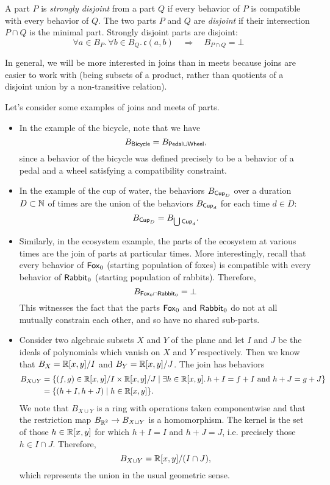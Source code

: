 \begin{defn}
A part $P$ is \emph{strongly disjoint} from a part $Q$ if every behavior of $P$
is compatible with every behavior of $Q$. The two parts $P$ and $Q$ are
\emph{disjoint} if their intersection $P \cap Q$ is the minimal part. Strongly
disjoint parts are disjoint:
$$\forall a \in B_P.\, \forall b \in B_Q.\, \mathfrak{c}(a, b) \quad\Rightarrow\quad B_{P \cap Q} = \bot$$
\end{defn}

In general, we will be more interested in joins than in meets because joins are easier to work with (being subsets of a product, rather than quotients of a disjoint union by a non-transitive relation).

\begin{ex}
Let's consider some examples of joins and meets of parts.
\begin{itemize}
    \item In the example of the bicycle, note that we have
    $$B_{\mathsf{{Bicycle}}} = B_{\mathsf{{Pedal}} \cup \mathsf{{Wheel}}},$$
    since a behavior of the bicycle was defined precisely to be a behavior of a pedal and a wheel satisfying a compatibility constraint.
    
    \item In the example of the cup of water, the behaviors $B_{\mathsf{{Cup}}_D}$ over a duration $D \subset \operatorname{\mathbb{N}}$ of times are the union of the behaviors $B_{\mathsf{{Cup}}_d}$ for each time $d \in D$:
    $$B_{\mathsf{{Cup}}_D} = B_{\bigcup \mathsf{{Cup}}_d}.$$
    
    \item Similarly, in the ecosystem example, the parts of the ecosystem at various times are the join of parts at particular times. More interestingly, recall that every behavior of $\mathsf{{Fox}}_0$ (starting population of foxes) is compatible with every behavior of $\mathsf{{Rabbit}}_0$ (starting population of rabbits). Therefore, 
    $$B_{\mathsf{{Fox}}_0 \cap \mathsf{{Rabbit}}_0} = \bot$$
    This witnesses the fact that the parts $\mathsf{{Fox}}_0$ and $\mathsf{{Rabbit}}_0$ do not at all mutually constrain each other, and so have no shared sub-parts.
    
    \item Consider two algebraic subsets $X$ and $Y$ of the plane and let $I$ and $J$ be the ideals of polynomials which vanish on $X$ and $Y$ respectively. Then we know that $B_X = \operatorname{\mathbb{R}}[x, y]/I$ and $B_Y = \operatorname{\mathbb{R}}[x, y]/J$. The join has behaviors 
    \begin{align*}
        B_{X \cup Y} &= \{(f, g) \in \operatorname{\mathbb{R}}[x, y]/I \times \operatorname{\mathbb{R}}[x, y]/J \mid \exists h \in \operatorname{\mathbb{R}}[x, y].\, h + I = f + I \mbox{ and } h + J = g + J\} \\
            &= \{(h + I, h + J) \mid h \in \operatorname{\mathbb{R}}[x, y]\}.
    \end{align*}
    We note that $B_{X \cup Y}$ is a ring with operations taken componentwise and that the restriction map $B_{\operatorname{\mathbb{R}}^2} \to B_{X \cup Y}$ is a homomorphism. The kernel is the set of those $h \in \operatorname{\mathbb{R}}[x, y]$ for which $h + I = I$ and $h + J = J$, i.e. precisely those $h \in I \cap J$. Therefore, 
    $$B_{X \cup Y} = \operatorname{\mathbb{R}}[x, y]/(I \cap J),$$
    which represents the union in the usual geometric sense.  
    

\end{itemize}
\end{ex}
